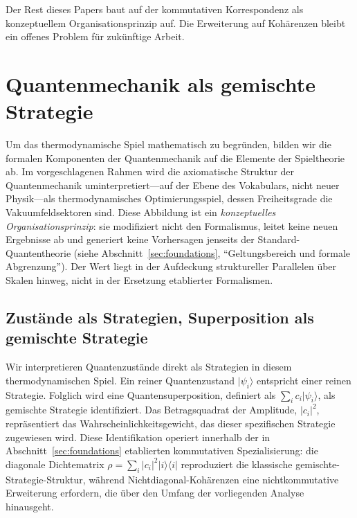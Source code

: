 \documentclass[12pt,a4paper]{article}
\theoremstyle{remark}
\begin{document}
Der Rest dieses Papers baut auf der kommutativen Korrespondenz als konzeptuellem Organisationsprinzip auf. Die Erweiterung auf Koh\"arenzen bleibt ein offenes Problem f\"ur zuk\"unftige Arbeit.

\section{Quantenmechanik als gemischte Strategie}
\label{sec:quantum}

Um das thermodynamische Spiel mathematisch zu begr\"unden, bilden wir die formalen Komponenten der Quantenmechanik auf die Elemente der Spieltheorie ab. Im vorgeschlagenen Rahmen wird die axiomatische Struktur der Quantenmechanik uminterpretiert---auf der Ebene des Vokabulars, nicht neuer Physik---als thermodynamisches Optimierungsspiel, dessen Freiheitsgrade die Vakuumfeldsektoren sind. Diese Abbildung ist ein \emph{konzeptuelles Organisationsprinzip}: sie modifiziert nicht den Formalismus, leitet keine neuen Ergebnisse ab und generiert keine Vorhersagen jenseits der Standard-Quantentheorie (siehe Abschnitt~\ref{sec:foundations}, ``Geltungsbereich und formale Abgrenzung''). Der Wert liegt in der Aufdeckung struktureller Parallelen \"uber Skalen hinweg, nicht in der Ersetzung etablierter Formalismen.

\subsection{Zust\"ande als Strategien, Superposition als gemischte Strategie}

Wir interpretieren Quantenzust\"ande direkt als Strategien in diesem thermodynamischen Spiel. Ein reiner Quantenzustand $|\psi_i\rangle$ entspricht einer reinen Strategie. Folglich wird eine Quantensuperposition, definiert als $\sum_i c_i |\psi_i\rangle$, als gemischte Strategie identifiziert. Das Betragsquadrat der Amplitude, $|c_i|^2$, repr\"asentiert das Wahrscheinlichkeitsgewicht, das dieser spezifischen Strategie zugewiesen wird. Diese Identifikation operiert innerhalb der in Abschnitt~\ref{sec:foundations} etablierten kommutativen Spezialisierung: die diagonale Dichtematrix $\rho = \sum_i |c_i|^2 |i\rangle\langle i|$ reproduziert die klassische gemischte-Strategie-Struktur, w\"ahrend Nichtdiagonal-Koh\"arenzen eine nichtkommutative Erweiterung erfordern, die \"uber den Umfang der vorliegenden Analyse hinausgeht.
\end{document}
